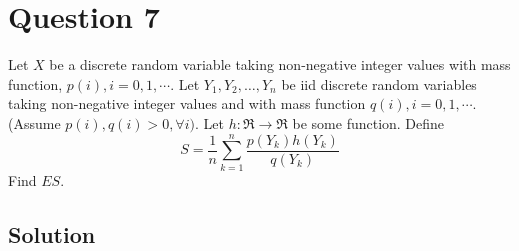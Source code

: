 \section*{Question 7}

Let \( X \) be a discrete random variable taking non-negative integer values with mass function, \( p(i), i=0,1, \cdots \).
Let \( Y_{1}, Y_{2}, \dots, Y_{n} \) be iid discrete random variables taking non-negative integer values and with mass function \( q(i), i=0,1, \cdots \).
(Assume \( p(i), q(i)>0, \forall i) \).
Let \( h: \Re \rightarrow \Re \) be some function.
Define
\[
    S=\frac{1}{n} \sum_{k=1}^{n} \frac{p\left(Y_{k}\right) h\left(Y_{k}\right)}{q\left(Y_{k}\right)}
\]
Find \( E S \).

\subsection*{Solution}
